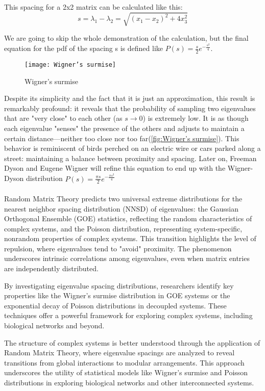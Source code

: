 \noindent This spacing for a 2x2 matrix can be calculated like this:
\[s = \lambda_1 - \lambda_2 = \sqrt{(x_1 - x_2)^2 + 4x_3^2}\]

\noindent We are going to skip the whole demonstration of the calculation, but the final equation for the pdf of the spacing s is defined like $P(s)=\frac{s}{2}e^{-\frac{s^2}{4}}$.

\begin{figure}[H]
    \captionsetup{aboveskip=5pt, belowskip=5pt} %
    \centering
    \texttt{[image: Wigner’s surmise]} %
    \caption{Wigner’s surmise}
    \label{fig:Wigner’s surmise}
\end{figure}
Despite its simplicity and the fact that it is just an approximation, this result is remarkably profound: it reveals that the probability of sampling two eigenvalues that are "very close" to each other (as $s \to 0$) is extremely low.
It is as though each eigenvalue "senses" the presence of the others and adjusts to maintain a certain distance—neither too close nor too far(\autoref{fig:Wigner’s surmise}).
This behavior is reminiscent of birds perched on an electric wire or cars parked along a street: maintaining a balance between proximity and spacing. \cite{livan_introduction_2017}
Later on, Freeman Dyson and Eugene Wigner will refine this equation to end up with the Wigner-Dyson distribution $P(s)=\frac{\pi s}{2}e^{-\frac{\pi s^2}{4}}$
\\\\
Random Matrix Theory predicts two universal extreme distributions for the nearest neighbor spacing distribution (NNSD) of eigenvalues: the Gaussian Orthogonal Ensemble (GOE) statistics, reflecting the random characteristics of complex systems, and the Poisson distribution, representing system-specific, nonrandom properties of complex systems.
This transition highlights the level of repulsion, where eigenvalues tend to "avoid" proximity.
The phenomenon underscores intrinsic correlations among eigenvalues, even when matrix entries are independently distributed.

\noindent By investigating eigenvalue spacing distributions, researchers identify key properties like the Wigner's surmise distribution in GOE systems or the exponential decay of Poisson distributions in decoupled systems.
These techniques offer a powerful framework for exploring complex systems, including biological networks and beyond.\cite{luo_application_2006}

The structure of complex systems is better understood through the application of Random Matrix Theory, where eigenvalue spacings are analyzed to reveal transitions from global interactions to modular arrangements.
This approach underscores the utility of statistical models like Wigner’s surmise and Poisson distributions in exploring biological networks and other interconnected systems.

